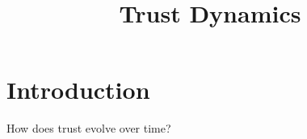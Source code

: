 \documentclass{article}
\title{Trust Dynamics}
\begin{document}
\maketitle    

\section{Introduction}
How does trust evolve over time?
\end{document}
